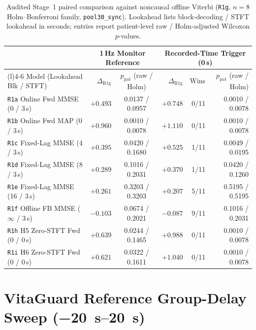 \begin{table}[htbp]
  \centering
  \footnotesize
  \setlength{\tabcolsep}{3.5pt}
  \caption{Audited Stage~1 paired comparison against noncausal offline Viterbi (\texttt{R1g}, $n=8$
  Holm--Bonferroni family, \texttt{pool30\_sync}). Lookahead lists block-decoding / STFT lookahead
  in seconds; entries report patient-level raw / Holm-adjusted Wilcoxon $p$-values.}
  \label{tab:app_r1g_holm}
  \begin{tabularx}{\textwidth}{@{}>{\raggedright\arraybackslash}X rc rrr@{}}
    \toprule
    & \multicolumn{2}{c}{\textbf{1\,Hz Monitor Reference}} & \multicolumn{3}{c}{\textbf{Recorded-Time Trigger (0\,s)}} \\
    \cmidrule(lr){2-3} \cmidrule(l){4-6}
    Model (Lookahead Blk / STFT) & $\Delta_{\mathrm{R1g}}$ & $p_{\mathrm{pat}}$ (raw / Holm) & $\Delta_{\mathrm{R1g}}$ & Wins & $p_{\mathrm{pat}}$ (raw / Holm) \\
    \midrule
    \texttt{R1a} Online Fwd MMSE (0 / 3\,s) & $+0.493$ & 0.0137 / 0.0957 & $+0.748$ & 0/11 & 0.0010 / 0.0078 \\
    \texttt{R1b} Online Fwd MAP (0 / 3\,s) & $+0.960$ & 0.0010 / 0.0078 & $+1.110$ & 0/11 & 0.0010 / 0.0078 \\
    \texttt{R1c} Fixed-Lag MMSE (4 / 3\,s) & $+0.395$ & 0.0420 / 0.1680 & $+0.525$ & 1/11 & 0.0049 / 0.0195 \\
    \texttt{R1d} Fixed-Lag MMSE (8 / 3\,s) & $+0.289$ & 0.1016 / 0.2031 & $+0.370$ & 1/11 & 0.0420 / 0.1260 \\
    \texttt{R1e} Fixed-Lag MMSE (16 / 3\,s) & $+0.261$ & 0.3203 / 0.3203 & $+0.207$ & 5/11 & 0.5195 / 0.5195 \\
    \texttt{R1f} Offline FB MMSE ($\infty$ / 3\,s) & $-0.103$ & 0.0674 / 0.2021 & $-0.087$ & 9/11 & 0.1016 / 0.2031 \\
    \texttt{R1h} H5 Zero-STFT Fwd (0 / 0\,s) & $+0.639$ & 0.0244 / 0.1465 & $+0.988$ & 0/11 & 0.0010 / 0.0078 \\
    \texttt{R1i} H6 Zero-STFT Fwd (0 / 0\,s) & $+0.621$ & 0.0322 / 0.1611 & $+1.040$ & 0/11 & 0.0010 / 0.0078 \\
    \bottomrule
  \end{tabularx}
\end{table}

\section{VitaGuard Reference Group-Delay Sweep (\SIrange{-20}{+20}{\second})}
\label{app:sec_lag_sweep}

